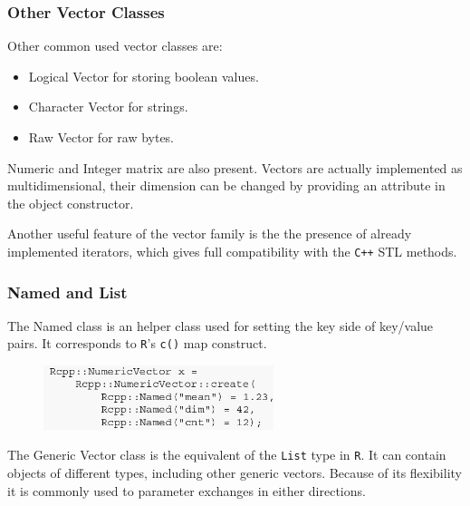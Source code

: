 \documentclass{beamer}
\def\code#1{\texttt{#1}} %
\begin{document}

\begin{frame}
\frametitle{Other Vector Classes}
	
Other common used vector classes are:
\begin{itemize}
	\item \alert{Logical Vector} for storing boolean values.
	\item \alert{Character Vector} for strings.
	\item \alert{Raw Vector} for raw bytes.
\end{itemize} \pause

\bigskip

Numeric and Integer matrix are also present. Vectors are actually implemented as multidimensional, their dimension can be changed by providing an attribute in the object constructor. \pause

\bigskip

Another useful feature of the vector family is the the presence of already implemented iterators, which gives full compatibility with the \code{C++} STL methods.

\end{frame}


\begin{frame}
	\frametitle{Named and List}
The \alert{Named} class is an helper class used for setting the key side of key/value pairs. It corresponds to \code{R}'s \code{c()} map construct.
\begin{figure}
	\includegraphics[width=0.6\textwidth]{named.png}
\end{figure} \pause

\bigskip

The \alert{Generic Vector} class is the equivalent of the \code{List} type in \code{R}. It can contain objects of different types, including other generic vectors. Because of its flexibility it is commonly used to parameter exchanges in either directions.

\end{frame}

\end{document}
